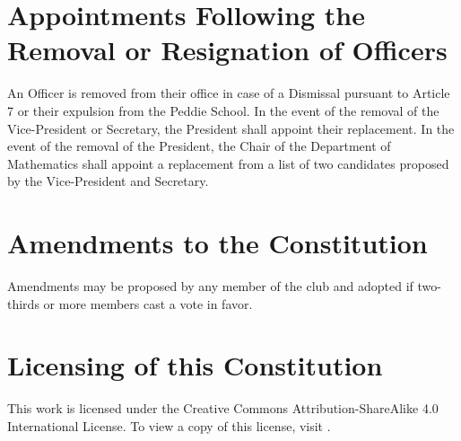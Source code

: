 \documentclass[12pt, letterpaper]{article}
\begin{document}
\section{Appointments Following the Removal or Resignation of Officers}
An Officer is removed from their office in case of a Dismissal pursuant to Article 7 or their expulsion from the Peddie School. In the event of the removal of the Vice-President or Secretary, the President shall appoint their replacement. In the event of the removal of the President, the Chair of the Department of Mathematics shall appoint a replacement from a list of two candidates proposed by the Vice-President and Secretary.

\section{Amendments to the Constitution}
Amendments may be proposed by any member of the club and adopted if  two-thirds or more members cast a vote in favor.

\section{Licensing of this Constitution}
This work is licensed under the Creative Commons Attribution-ShareAlike 4.0 International License. To view a copy of this license, visit \underline{\href{https://creativecommons.org/licenses/by-sa/4.0/}{\color{blue}{https://creativecommons.org/licenses/by-sa/4.0/}}}.
\end{document}

